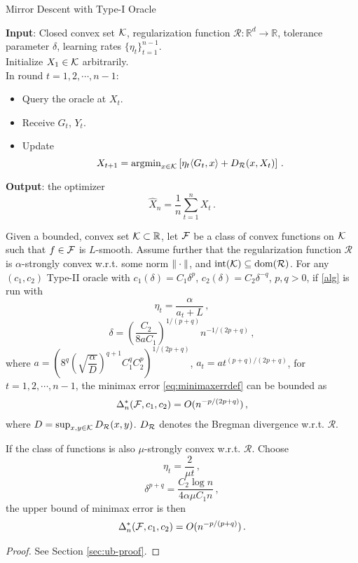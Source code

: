 \begin{algorithm}
	\caption{Mirror Descent with Type-I Oracle}\label{alg}
	\textbf{Input}: Closed convex set $\mathcal{K}$, regularization function $\mathcal{R}:\mathbb{R}^d\to \mathbb{R}$, tolerance parameter $\delta$, learning rates $\{\eta_t\}_{t=1}^{n-1}$. \\
	Initialize $X_1\in \mathcal{K}$ arbitrarily.\\
	In round $t=1, 2, \cdots, n-1$:
	\begin{itemize}
	\item Query the oracle at $X_t$.
	\item Receive $G_t$, $Y_t$.
	\item Update
	\[
	X_{t+1}=\operatorname{argmin}_{x\in \mathcal{K}}\left[ \eta_{t} \langle G_t,x \rangle+D_{\mathcal{R}}(x,X_t) \right] \,.
	\]
	\end{itemize}
	\textbf{Output}: the optimizer
	\[
	\hat{X}_n = \dfrac{1}{n}\sum_{t=1}^n X_t \,.
	\]
	
\end{algorithm}

\begin{theorem}
\label{thm:ub}
Given a bounded, convex set $\mathcal{K} \subset \mathbb{R}$,
let $\mathcal{F}$ be a class of convex functions on $\mathcal{K}$ such that $f \in \mathcal{F}$ is $L$-smooth.
Assume further that the regularization function $\mathcal{R}$ is $\alpha$-strongly convex w.r.t. some norm $\|\cdot\|$, and $\operatorname{int}(\mathcal{K})\subseteq \operatorname{dom}(\mathcal{R})$.
For any $(c_1,c_2)$ Type-II oracle 
 with $c_1(\delta) = C_1 \delta^p$, $c_2(\delta) = C_2 \delta^{-q}$, $p,q>0$, 
 if \cref{alg} is run with 
 \[
 \eta_t = \dfrac{\alpha}{a_t+L} \,,
 \]
  \[
 \delta = \left( \dfrac{C_2}{8aC_1}\right)^{1/(p+q)}n^{-1/(2p+q)} \,,
 \] 
 where
 $a = \left( 8^q \left(\sqrt{\dfrac{\alpha}{D}}\right)^{q+1}C_1^q C_2^p \right)^{1/(2p+q)}$,
 $a_t = a t^{(p+q)/(2p+q)}$, for $t=1, 2, \cdots, n-1$,
  the minimax error \eqref{eq:minimaxerrdef} can be bounded as
 \begin{align*}
\Delta_n^*(\mathcal{F},c_1,c_2)= O(n^{-p/(2p+q)})\,,
 \end{align*}
 where $D=\sup_{x,y\in \mathcal{K}} D_{\mathcal{R}}(x,y)$. $D_{\mathcal{R}}$ denotes the Bregman divergence w.r.t. $\mathcal{R}$.
 
If the class of functions is also $\mu$-strongly convex w.r.t. $\mathcal{R}$. Choose
\[
 \eta_t = \dfrac{2}{\mu t} \,,
\]
\[
\delta^{p+q} =  \dfrac{C_2 \log n}{4\alpha \mu C_1 n} \,,
\]
the upper bound of minimax error is then
 \begin{align*}
\Delta_n^*(\mathcal{F},c_1,c_2)= O(n^{-p/(p+q)})\,.
 \end{align*}
\end{theorem}
\begin{proof}
See Section \ref{sec:ub-proof}.
\end{proof}


